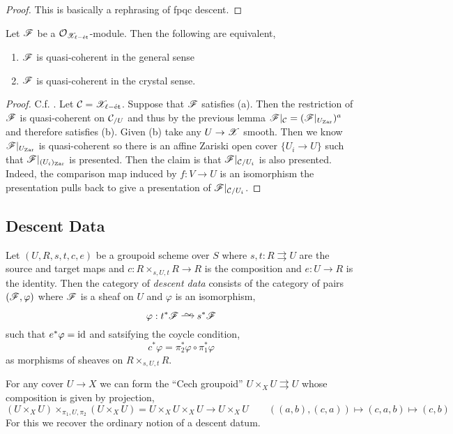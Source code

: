 \documentclass[12pt]{article}
\begin{document}
\begin{proof}
This is basically a rephrasing of fpqc descent.
\end{proof}

\begin{prop}
Let $\mathscr{F}$ be a $\mathcal{O}_{\mathscr{X}_{\ell-\text{\'{e}t}}}$-module. Then the following are equivalent,
\begin{enumerate}
\item $\mathscr{F}$ is quasi-coherent in the general sense
\item $\mathscr{F}$ is quasi-coherent in the crystal sense.
\end{enumerate}
\end{prop}

\begin{proof}
C.f. . Let $\mathcal{C} = \mathscr{X}_{\ell-\text{\'{e}t}}$. Suppose that $\mathscr{F}$ satisfies (a). Then the restriction of $\mathscr{F}$ is quasi-coherent on $\mathcal{C}_{/U}$ and thus by the previous lemma $\mathscr{F}|_{\mathcal{C}} = (\mathscr{F}|_{U_{\mathrm{Zar}}})^a$ and therefore satisfies (b). Given (b) take any $U \to \mathscr{X}$ smooth. Then we know $\mathscr{F}|_{U_{\mathrm{Zar}}}$ is quasi-coherent so there is an affine Zariski open cover $\{ U_i \to U \}$ such that $\mathscr{F}|_{(U_i)_{\mathrm{Zar}}}$ is presented. Then the claim is that $\mathscr{F}|_{\mathcal{C}/U_i}$ is also presented. Indeed, the comparison map induced by $f : V \to U$ is an isomorphism the presentation pulls back to give a presentation of $\mathscr{F}|_{\mathcal{C}/U_i}$. 
\end{proof}

\subsection{Descent Data}

\begin{defn}
Let $(U,R,s,t,c, e)$ be a groupoid scheme over $S$ where $s,t : R \rightrightarrows U$ are the source and target maps and $c : R \times_{s,U,t} R \to R$ is the composition and $e : U \to R$ is the identity. Then the category of \textit{descent data} consists of the category of pairs $(\mathscr{F}, \varphi)$ where $\mathscr{F}$ is a sheaf on $U$ and $\varphi$ is an isomorphism,
\[ \varphi : t^* \F \iso s^* \F \]
such that $e^* \varphi = \mathrm{id}$ and satsifying the coycle condition,
\[ c^* \varphi = \pi_2^* \varphi \circ \pi_1^* \varphi \]
as morphisms of sheaves on $R \times_{s,U,t} R$. 
\end{defn}

\begin{example}
For any cover $U \to X$ we can form the ``Cech groupoid'' $U \times_X U \rightrightarrows U$ whose composition is given by projection,
\[ (U \times_X U) \times_{\pi_1, U, \pi_2} (U \times_X U) = U \times_X U \times_X U \to U \times_X U \quad \quad ((a,b), (c,a)) \mapsto (c,a,b) \mapsto (c, b) \] 
For this we recover the ordinary notion of a descent datum. 
\end{example}
\end{document}
